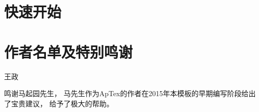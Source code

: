 \documentclass[UTF8]{ctexart}
\numberwithin{figure}{section}
\numberwithin{equation}{section}
\begin{document}
\pagebreak

\tableofcontents

\pagebreak


\section{快速开始}
\cite{刘海洋2013LATEX}

\section{作者名单及特别鸣谢}
王政

鸣谢马起园先生， 马先生作为ApTex的作者在2015年本模板的早期编写阶段给出了宝贵建议， 给予了极大的帮助。


\end{document}
